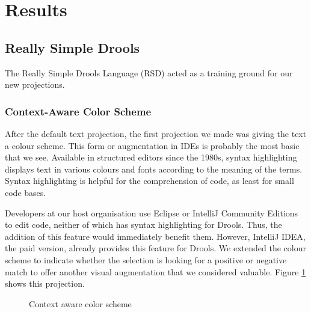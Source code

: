 \section{Results}
\label{section:dsr_results}

\subsection{Really Simple Drools}

The Really Simple Drools Language (RSD) acted as a training ground for our new projections.

\subsubsection{Context-Aware Color Scheme}
After the default text projection, the first projection we made was giving the text a colour scheme.
This form or augmentation in IDEs is probably the most basic that we see.
Available in structured editors since the 1980s\cite{cowlishaw1987lexx}, syntax highlighting displays text in various colours and fonts according to the meaning of the terms.
Syntax highlighting is helpful for the comprehension of code, as least for small code bases\cite{sarkar2015impact}.

Developers at our host organisation use Eclipse or IntelliJ Community Editions to edit code, neither of which has syntax highlighting for Drools. Thus, the addition of this feature would immediately benefit them.
However, IntelliJ IDEA, the paid version, already provides this feature for Drools.
We extended the colour scheme to indicate whether the selection is looking for a positive or negative match to offer another visual augmentation that we considered valuable.
Figure \ref{fig:colorscheme} shows this projection.

\begin{figure}
    \centering
    \caption{Context aware color scheme}
    \label{fig:colorscheme}
\end{figure}

